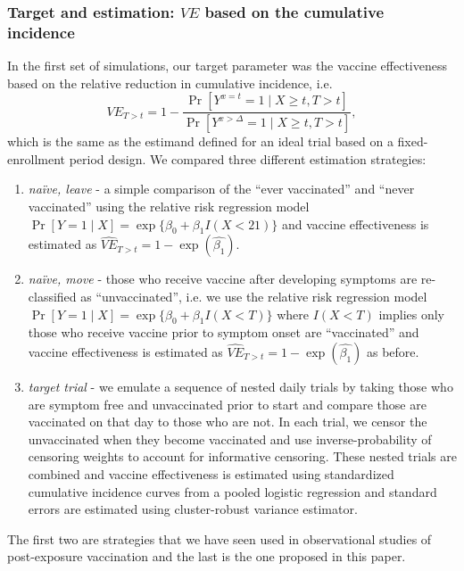 \begin{appendices}
\begin{refsection}
    \subsubsection{Target and estimation: $VE$ based on the cumulative incidence}
    In the first set of simulations, our target parameter was the vaccine effectiveness based on the relative reduction in cumulative incidence, i.e.
    $$
    VE_{T > t} = 1 - \frac{\Pr[Y^{x = t} = 1 \mid X \geq t, T > t]}{\Pr[Y^{x > \Delta} = 1 \mid X \geq t, T > t]},
    $$
    which is the same as the estimand defined for an ideal trial based on a fixed-enrollment period design. We compared three different estimation strategies:
    \begin{enumerate}
        \item \textit{na\"{i}ve, leave} - a simple comparison of the ``ever vaccinated'' and ``never vaccinated'' using the relative risk regression model $\Pr[Y = 1 \mid X] = \operatorname{exp}\{\beta_0 + \beta_1 I(X < 21)\}$ and vaccine effectiveness is estimated as $\widehat{VE}_{T > t} = 1 - \exp(\widehat{\beta_1})$.
        \item \textit{na\"{i}ve, move} - those who receive vaccine after developing symptoms are re-classified as ``unvaccinated'', i.e. we use the relative risk regression model $\Pr[Y = 1 \mid X] = \operatorname{exp}\{\beta_0 + \beta_1 I(X < T)\}$ where $I(X<T)$ implies only those who receive vaccine prior to symptom onset are ``vaccinated'' and vaccine effectiveness is estimated as $\widehat{VE}_{T > t} = 1 - \exp(\widehat{\beta_1})$ as before.
        \item \textit{target trial} - we emulate a sequence of nested daily trials by taking those who are symptom free and unvaccinated prior to start and compare those are vaccinated on that day to those who are not. In each trial, we censor the unvaccinated when they become vaccinated and use inverse-probability of censoring weights to account for informative censoring. These nested trials are combined and vaccine effectiveness is estimated using standardized cumulative incidence curves from a pooled logistic regression and standard errors are estimated using cluster-robust variance estimator.
    \end{enumerate}
    The first two are strategies that we have seen used in observational studies of post-exposure vaccination and the last is the one proposed in this paper.


\end{refsection}
\end{appendices}
